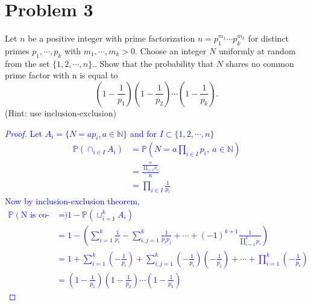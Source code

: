\documentclass{article}
\begin{document}
\section*{Problem 3}
Let $n$ be a positive integer with prime factorization $ n=p_1^{m_1} \cdots p_k^{m_k}$ for distinct primes $p_1,\cdots ,p_k$ with $m_1,\cdots,m_k>0$. Choose an integer $N$ uniformly at random from the set $\{1,2,\cdots,n\}.$. Show that the probability that $N$ shares no common prime factor with n is equal to
\begin{equation*}
    \left(1-\frac{1}{p_1}\right)\left(1-\frac{1}{p_2}\right)\cdots \left(1-\frac{1}{p_k}\right).
\end{equation*}
(Hint: use inclusion-exclusion)
\textcolor{blue}{
\begin{proof}
    Let $A_i = \{N = ap_i, a \in \mathbb{N}\}$ and for $I \subset \{1,2,\cdots,n\}$
    \begin{equation*}
        \begin{split}
            \mathbb{P}(\cap_{i \in I} A_i) &= \mathbb{P}(N = a\prod_{i\in I}p_i,\ a \in \mathbb{N})\\
            &= \frac{\frac{n}{\prod_{i\in I}p_i}}{n}\\
            &= \prod_{i\in I}\frac{1}{p_i}
        \end{split}
    \end{equation*}
    Now by inclusion-exclusion theorem,
    \begin{equation*}
        \begin{split}
            \mathbb{P}(\text{N is co-prime to n}) &= 1-\mathbb{P}(\cup_{i=1}^{k} A_i)\\
            &= 1-\left(\sum_{i=1}^k\frac{1}{p_i}-\sum_{i,j=1}^k\frac{1}{p_ip_j}+\cdots+(-1)^{k+1}\frac{1}{\prod_{i=1}^kp_i} \right)\\
            &= 1+\sum_{i=1}^k\left(-\frac{1}{p_i}\right)+\sum_{i,j=1}^k\left(-\frac{1}{p_i} \right)\left( -\frac{1}{p_j}\right)+\cdots+\prod_{i=1}^k\left(-\frac{1}{p_i}\right)\\
            &= \left(1-\frac{1}{p_1}\right)\left(1-\frac{1}{p_2}\right)\cdots \left(1-\frac{1}{p_k}\right)
        \end{split}
    \end{equation*}
\end{proof}
}
\end{document}
